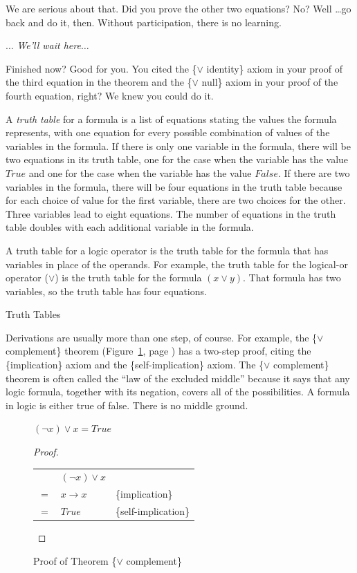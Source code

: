 We are serious about that. Did you prove the other two equations?
No? Well \dots go back and do it, then. Without participation, there
is no learning.

\smallskip
$\dots$ \emph{We'll wait here}$\dots$
\smallskip

Finished now? Good for you. You cited the \{$\vee$ identity\} axiom in your
proof of the third equation in the theorem and the \{$\vee$ null\}
axiom in your proof of the fourth equation, right? We knew you could do it.

\begin{aside}
A \emph{truth table} for a formula is a list of equations
stating the values the formula represents,
with one equation for every possible combination of values
of the variables in the formula.
If there is only one variable in the formula,
there will be two equations in its truth table,
one for the case when the variable has the value
$True$ and one for the case when the variable has the value $False$.
If there are two variables in the formula,
there will be four equations in the truth table
because for each choice of value for the first variable,
there are two choices for the other.
Three variables lead to eight equations.
The number of equations in the truth table
doubles with each additional variable
in the formula.

A truth table for a logic operator is the truth table for the formula
that has variables in place of the operands.
For example, the truth table for the logical-or operator ($\vee$)
is the truth table for the formula $(x \vee y)$.
That formula has two variables, so the truth table has four equations.
\caption{Truth Tables}
\label{truth-tables}
\end{aside}

Derivations are usually more than one step, of course.
For example, the
\{$\vee$ complement\} theorem
(Figure~\ref{fig:or-complement-thm}, page \pageref{fig:or-complement-thm})
has a two-step proof, citing the \{implication\} axiom
and the \{self-implication\} axiom.
The \{$\vee$ complement\} theorem is often called the
``law of the excluded middle'' because it says that any
logic formula, together with its negation, covers all
of the possibilities.
A formula in logic is either true of false.
There is no middle ground.

\begin{figure}
\begin{theorem}
$(\neg x) \vee x = True$
\end{theorem}
\begin{proof}
\mbox{}\\
\begin{tabular}{lll}
    & $(\neg x) \vee x$ & \\
$=$ & $x \rightarrow x$ & \{implication\} \\
$=$ & $True$            & \{self-implication\} \\
\end{tabular}

\end{proof}
\caption{Proof of Theorem \{$\vee$ complement\}}
\label{fig:or-complement-thm}
\end{figure}

